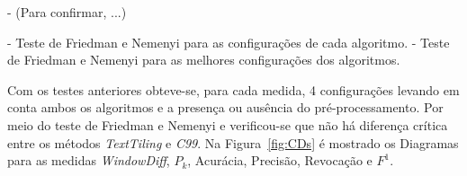 

- (Para confirmar, ...)

- Teste de Friedman e Nemenyi para as configurações de cada algoritmo.
- Teste de Friedman e Nemenyi para as melhores configurações dos algoritmos.








Com os testes anteriores obteve-se, para cada medida, 4 configurações levando em conta ambos os algoritmos e a presença ou ausência do pré-processamento. Por meio do teste de Friedman e Nemenyi e verificou-se que não há diferença crítica entre os métodos \textit{TextTiling} e \textit{C99}. Na Figura~\ref{fig:CDs} é mostrado os Diagramas para as medidas \textit{WindowDiff}, $P_k$, Acurácia, Precisão, Revocação e $F^1$.	














